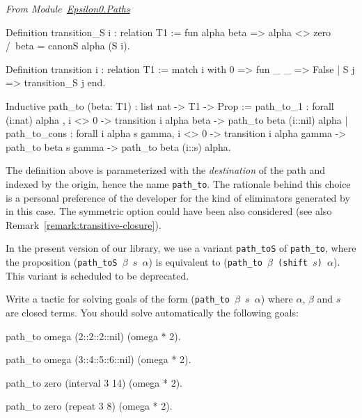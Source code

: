 \vspace{4pt}
\emph{From Module~\href{../theories/html/hydras.Epsilon0.Paths.html}{Epsilon0.Paths}}

\label{sect:path-to-def}

\begin{Coqsrc}
Definition transition_S i : relation T1 :=
fun alpha beta =>
    alpha <> zero /\ beta = canonS alpha (S i).

Definition transition i : relation T1 :=
  match i with 0 => fun _ _ => False | S j => transition_S j end.

Inductive path_to (beta: T1) : list nat -> T1 -> Prop :=
  path_to_1 : forall (i:nat) alpha , 
    i <> 0 ->
    transition i alpha beta ->
    path_to beta (i::nil) alpha
| path_to_cons : forall i alpha s gamma,
    i <> 0 ->
    transition i alpha gamma ->
    path_to beta  s gamma ->
    path_to beta  (i::s) alpha.
\end{Coqsrc}



\begin{remark}
The definition above is parameterized with the \emph{destination} of the path and indexed by the origin, hence the name \texttt{path\_to}. The rationale behind this choice is a personal preference of the developer  for the kind of eliminators generated by \coq{} in this case. The symmetric option could have been also considered (see also Remark~\vref{remark:transitive-closure}).
\end{remark}



\begin{remark}
In the present version of our library, we use a variant \texttt{path\_toS} of
\texttt{path\_to}, where the proposition
(\texttt{path\_toS $\beta$ $s$ $\alpha$}) is equivalent to
(\texttt{path\_to $\beta$ (shift $s$) $\alpha$}). This variant is scheduled to be deprecated.
\end{remark}


\begin{exercise}
Write a tactic for solving goals of the form (\texttt{path\_to $\beta$ $s$ $\alpha$})
where $\alpha$, $\beta$ and $s$ are closed terms. 
You should solve automatically the following goals:

\begin{Coqsrc}
 path_to omega (2::2::2::nil) (omega * 2).

 path_to omega (3::4::5::6::nil) (omega * 2).

 path_to zero (interval 3 14) (omega * 2).

 path_to zero (repeat 3 8) (omega * 2).
\end{Coqsrc}

\end{exercise}



